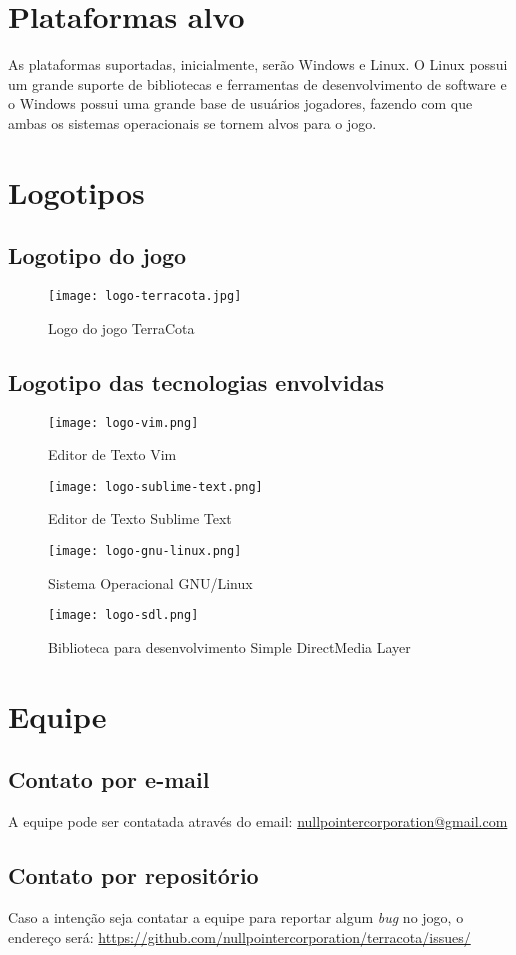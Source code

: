 \documentclass[11pt]{article}
\begin{document}
\section{Plataformas alvo}
As plataformas suportadas, inicialmente, serão Windows e Linux.
O Linux possui um grande suporte de bibliotecas e ferramentas de desenvolvimento de software e o Windows possui uma grande base de usuários jogadores, fazendo com que ambas os sistemas operacionais se tornem alvos para o jogo.

\section{Logotipos}
\subsection{Logotipo do jogo}
\begin{figure}[!htp]
\centering
\texttt{[image: logo-terracota.jpg]}
\caption{Logo do jogo TerraCota}
\label{TerraCota logo}
\end{figure}

\subsection{Logotipo das tecnologias envolvidas}
\begin{figure}[!htp]
\centering
\texttt{[image: logo-vim.png]}
\caption{Editor de Texto Vim}
\label{Vim logo}
\end{figure}

\begin{figure}[!htp]
\centering
\texttt{[image: logo-sublime-text.png]}
\caption{Editor de Texto Sublime Text}
\label{Sublime Text logo}
\end{figure}

\begin{figure}[!htp]
\centering
\texttt{[image: logo-gnu-linux.png]}
\caption{Sistema Operacional GNU/Linux}
\label{GNU/Linux logo}
\end{figure}

\begin{figure}[!htp]
\centering
\texttt{[image: logo-sdl.png]}
\caption{Biblioteca para desenvolvimento Simple DirectMedia Layer}
\label{SDL logo}
\end{figure}

\section{Equipe}
\subsection{Contato por e-mail}
A equipe pode ser contatada através do email: \url{nullpointercorporation@gmail.com}

\subsection{Contato por repositório}
Caso a intenção seja contatar a equipe para reportar algum \textit{bug} no jogo, o endereço será: \url{https://github.com/nullpointercorporation/terracota/issues/}
\newpage
\end{document}
